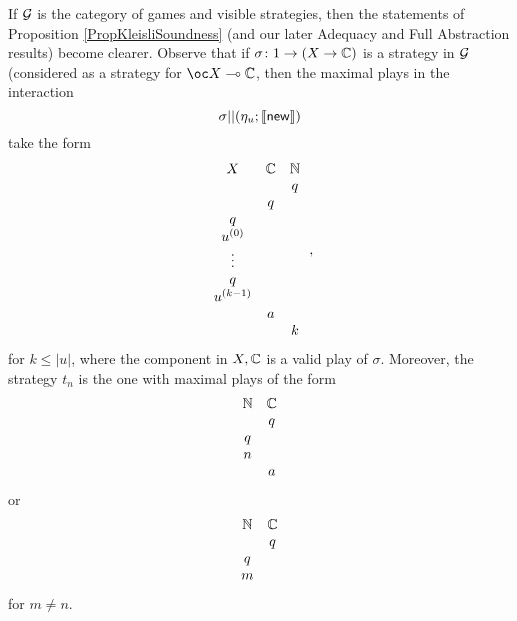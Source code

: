 \documentclass[11pt]{report}
\begin{document}
If $\mathcal G$ is the category of games and visible strategies, then the statements of Proposition \ref{PropKleisliSoundness} (and our later Adequacy and Full Abstraction results) become clearer.  
Observe that if $\sigma \colon 1 \to (X \to \mathbb{C})$ is a strategy in $\mathcal G$ (considered as a strategy for $\oc X \implies \bC$, then the maximal plays in the interaction
\[
  \sigma || (\eta_u;\left\llbracket\operatorname{{\mathsf{new}}}\right\rrbracket)
  \]
take the form
\[
  \begin{array}{ccc}
    X         & \mathbb{C} & \mathbb{N} \\
              &     &  q  \\
              &  q  &     \\
    q         &     &     \\
    u^{(0)}   &     &     \\
    \vdots    &     &     \\
    q         &     &     \\
    u^{(k-1)} &     &     \\
              &  a  &     \\
              &     &  k  \\
  \end{array}\,,
  \]
for $k\le |u|$, where the component in $X,\mathbb{C}$ is a valid play of $\sigma$.
Moreover, the strategy $t_n$ is the one with maximal plays of the form
\[
  \begin{array}{cc}
    \mathbb{N} & \mathbb{C} \\
        &  q  \\
    q   &     \\
    n   &     \\
        &  a
  \end{array}
  \]
or
\[
  \begin{array}{cc}
    \mathbb{N} & \mathbb{C} \\
        &  q  \\
    q   &     \\
    m   &
  \end{array}
  \]
for $m\ne n$.
\end{document}
